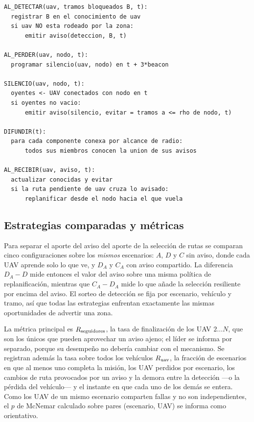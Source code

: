 \documentclass[journal,10pt]{IEEEtran}
\begin{document}
\begin{lstlisting}[caption={Difusión del aviso y reacción en vuelo; complementa el pseudocódigo anterior.},label={alg:flota}]
AL_DETECTAR(uav, tramos bloqueados B, t):
  registrar B en el conocimiento de uav
  si uav NO esta rodeado por la zona:
      emitir aviso(deteccion, B, t)

AL_PERDER(uav, nodo, t):
  programar silencio(uav, nodo) en t + 3*beacon

SILENCIO(uav, nodo, t):
  oyentes <- UAV conectados con nodo en t
  si oyentes no vacio:
      emitir aviso(silencio, evitar = tramos a <= rho de nodo, t)

DIFUNDIR(t):
  para cada componente conexa por alcance de radio:
      todos sus miembros conocen la union de sus avisos

AL_RECIBIR(uav, aviso, t):
  actualizar conocidas y evitar
  si la ruta pendiente de uav cruza lo avisado:
      replanificar desde el nodo hacia el que vuela
\end{lstlisting}

\subsection{Estrategias comparadas y métricas}

Para separar el aporte del aviso del aporte de la selección de rutas se
comparan cinco configuraciones sobre los \emph{mismos} escenarios: $A$, $D$
y $C$ sin aviso, donde cada UAV aprende solo lo que ve, y $D_A$ y $C_A$ con
aviso compartido. La diferencia $D_A-D$ mide entonces el valor del aviso
sobre una misma política de replanificación, mientras que $C_A-D_A$ mide lo
que añade la selección resiliente por encima del aviso. El sorteo de
detección se fija por escenario, vehículo y tramo, así que todas las
estrategias enfrentan exactamente las mismas oportunidades de advertir una
zona.

La métrica principal es $R_{\rm seguidores}$, la tasa de finalización de los
UAV $2\ldots N$, que son los únicos que pueden aprovechar un aviso ajeno; el
líder se informa por separado, porque su desempeño no debería cambiar con el
mecanismo. Se registran además la tasa sobre todos los vehículos
$R_{\rm uav}$, la fracción de escenarios en que al menos uno completa la
misión, los UAV perdidos por escenario, los cambios de ruta provocados por un
aviso y la demora entre la detección ---o la pérdida del vehículo--- y el
instante en que cada uno de los demás se entera. Como los UAV de un mismo
escenario comparten fallas y no son independientes, el $p$ de McNemar
calculado sobre pares (escenario, UAV) se informa como orientativo.
\end{document}
